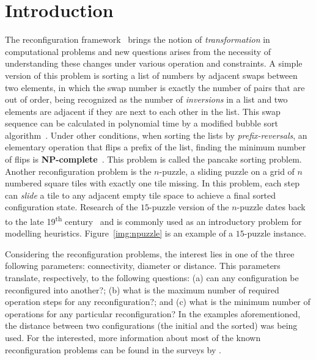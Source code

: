 \documentclass[msc]{ppgccufmg}    %
\begin{document}

\chapter{Introduction}
\label{chp:intro}

The reconfiguration framework~\citep{Ito:2011} brings the notion of 
\textit{transformation} in computational problems and new questions arises 
from the necessity of understanding these changes under various operation 
and constraints.
A simple version of this problem is sorting a list of numbers by adjacent swaps 
between two elements, in which the swap number is exactly the number of 
pairs that are out of order, being recognized as the number of \textit{
inversions} in a list and two elements are adjacent if they are next to each 
other in the list.
This swap sequence can be calculated in polynomial time by a modified bubble 
sort algorithm~\citep{Knuth:1998}.
Under other conditions, when sorting the lists by \textit{prefix-reversals}, 
an elementary operation that flips a prefix of the list, finding the 
minimum number of flips is \textbf{NP-complete}~\citep{Bulteau:2015}.
This problem is called the pancake sorting problem.
Another reconfiguration problem is the $n$-puzzle, a sliding puzzle on a 
grid of $n$ numbered square tiles with exactly one tile missing.
In this problem, each step can \textit{slide} a tile to any adjacent empty tile 
space to achieve a final sorted configuration state.
Research of the $15$-puzzle version of the $n$-puzzle dates back to the late 
19\textsuperscript{th} century~\citep{Johnson:1879} and is commonly used as an 
introductory problem for modelling heuristics.
Figure~\ref{img:npuzzle} is an example of a $15$-puzzle instance.

Considering the reconfiguration problems, the interest lies in one of the three
following parameters: connectivity, diameter or distance.
This parameters translate, respectively, to the following questions: (a) can any
configuration be reconfigured into another?; (b) what is the maximum number of 
required operation steps for any reconfiguration?; and (c) what is the minimum 
number of operations for any particular reconfiguration?
In the examples aforementioned, the distance between two configurations (the 
initial and the sorted) was being used.
For the interested, more information about most of the known reconfiguration 
problems can be found in the surveys by \citep
{Heuvel:2013,Mouawad:2015,Naomi:2018}.
\end{document}
